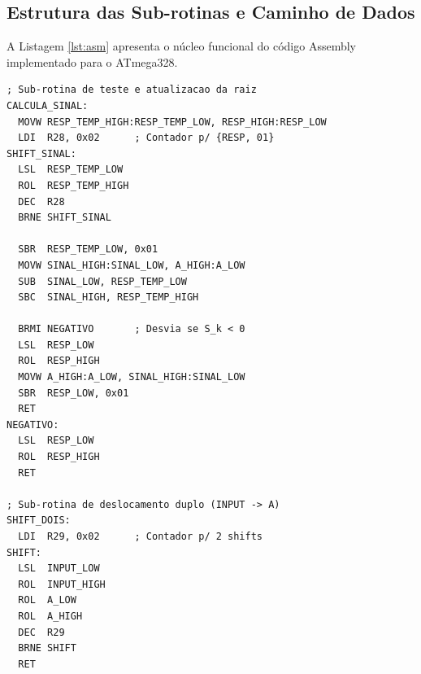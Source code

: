 \documentclass[conference]{IEEEtran}
\begin{document}
\subsection{Estrutura das Sub-rotinas e Caminho de Dados}
A Listagem \ref{lst:asm} apresenta o núcleo funcional do código Assembly implementado para o ATmega328.

\begin{lstlisting}[caption={Nucleo do algoritmo em Assembly AVR (main.asm).}, label={lst:asm}]
; Sub-rotina de teste e atualizacao da raiz
CALCULA_SINAL:
  MOVW RESP_TEMP_HIGH:RESP_TEMP_LOW, RESP_HIGH:RESP_LOW
  LDI  R28, 0x02      ; Contador p/ {RESP, 01}
SHIFT_SINAL:
  LSL  RESP_TEMP_LOW
  ROL  RESP_TEMP_HIGH
  DEC  R28
  BRNE SHIFT_SINAL

  SBR  RESP_TEMP_LOW, 0x01
  MOVW SINAL_HIGH:SINAL_LOW, A_HIGH:A_LOW
  SUB  SINAL_LOW, RESP_TEMP_LOW
  SBC  SINAL_HIGH, RESP_TEMP_HIGH

  BRMI NEGATIVO       ; Desvia se S_k < 0
  LSL  RESP_LOW
  ROL  RESP_HIGH
  MOVW A_HIGH:A_LOW, SINAL_HIGH:SINAL_LOW
  SBR  RESP_LOW, 0x01
  RET
NEGATIVO:
  LSL  RESP_LOW
  ROL  RESP_HIGH
  RET

; Sub-rotina de deslocamento duplo (INPUT -> A)
SHIFT_DOIS:
  LDI  R29, 0x02      ; Contador p/ 2 shifts
SHIFT:
  LSL  INPUT_LOW
  ROL  INPUT_HIGH
  ROL  A_LOW
  ROL  A_HIGH
  DEC  R29
  BRNE SHIFT
  RET
\end{lstlisting}
\end{document}
